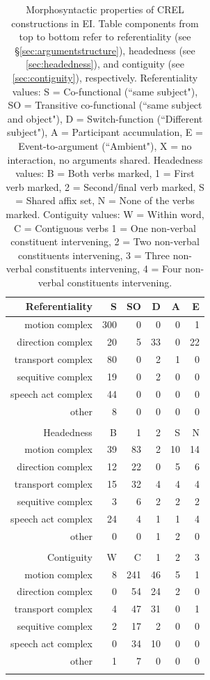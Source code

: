 \begin{table}
\centering
\begin{tabular}{rrrrrr}
  \lsptoprule
Referentiality & S & SO & D & A & E \\ 
  \midrule
motion complex & 300 &   0 &   0 &   0 &   1 \\ 
  direction complex &  20 &   5 &  33 &   0 &  22 \\ 
  transport complex &  80 &   0 &   2 &   1 &   0 \\ 
  sequitive complex &  19 &   0 &   2 &   0 &   0 \\ 
  speech act complex &  44 &   0 &   0 &   0 &   0 \\ 
  other &   8 &   0 &   0 &   0 &   0 \\ 
   \midrule
 \\
  \midrule
Headedness & B & 1 & 2 & S & N \\ 
  \midrule
motion complex &  39 &  83 &   2 &  10 &  14 \\ 
  direction complex &  12 &  22 &   0 &   5 &   6 \\ 
  transport complex &  15 &  32 &   4 &   4 &   4 \\ 
  sequitive complex &   3 &   6 &   2 &   2 &   2 \\ 
  speech act complex &  24 &   4 &   1 &   1 &   4 \\ 
  other &   0 &   0 &   1 &   2 &   0 \\ 
   \midrule
 \\
  \midrule
Contiguity & W & C & 1 & 2 & 3 \\ 
  \midrule
motion complex &   8 & 241 &  46 &   5 &   1 \\ 
  direction complex &   0 &  54 &  24 &   2 &   0 \\ 
  transport complex &   4 &  47 &  31 &   0 &   1 \\ 
  sequitive complex &   2 &  17 &   2 &   0 &   0 \\ 
  speech act complex &   0 &  34 &  10 &   0 &   0 \\ 
  other &   1 &   7 &   0 &   0 &   0 \\ 
   \lspbottomrule
\end{tabular}
\caption[Morphosyntactic properties of CREL constructions]{Morphosyntactic properties of CREL constructions in EI. Table components from top to bottom refer to referentiality (see §\ref{sec:argumentstructure}), headedness (see \ref{sec:headedness}), and contiguity (see \ref{sec:contiguity}), respectively. Referentiality values: S = Co-functional (``same subject"), SO = Transitive co-functional (``same subject and object"), D = Switch-function (``Different subject"), A = Participant accumulation, E = Event-to-argument (``Ambient"), X = no interaction, no arguments shared. Headedness values: B = Both verbs marked, 1 = First verb marked, 2 = Second/final verb marked, S = Shared affix set, N = None of the verbs marked. Contiguity values: W = Within word, C = Contiguous verbs 1 = One non-verbal constituent intervening, 2 = Two non-verbal constituents intervening, 3 = Three non-verbal constituents intervening, 4 = Four non-verbal constituents intervening.}
\label{table:crel_formal}
\end{table}


